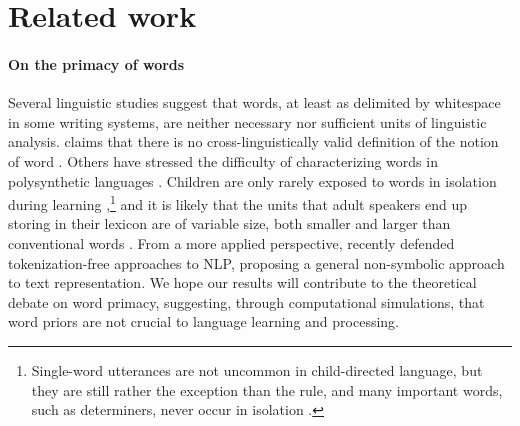 \section{Related work}
\label{sec:related}

\paragraph{On the primacy of words} Several linguistic studies suggest
that words, at least as delimited by whitespace in some writing
systems, are neither necessary nor sufficient units of linguistic
analysis.  claims that there is no
cross-linguistically valid definition of the notion of word \cite[see also][who
address specifically the notion of prosodic
word]{Schiering:etal:2010}. Others have stressed the difficulty of
characterizing words in polysynthetic languages
\cite{Bickel:Zuniga:2017}. Children are only rarely exposed to words
in isolation during learning
\cite{Tomasello:2003},\footnote{Single-word utterances are not
  uncommon in child-directed language, but they are still rather the
  exception than the rule, and many important words, such as
  determiners, never occur in isolation
  \cite{Christiansen:etal:2005}.} and it is likely that the units that
adult speakers end up storing in their lexicon are of variable size,
both smaller and larger than conventional words
\cite[e.g.,][]{Jackendoff:2002,Goldberg:2005}. From a more applied
perspective,  recently defended tokenization-free
approaches to NLP, proposing a general non-symbolic approach to text
representation. %
We hope our results will contribute to the theoretical
debate on word primacy, suggesting, through computational simulations, that
word priors are not crucial to language learning and processing.

